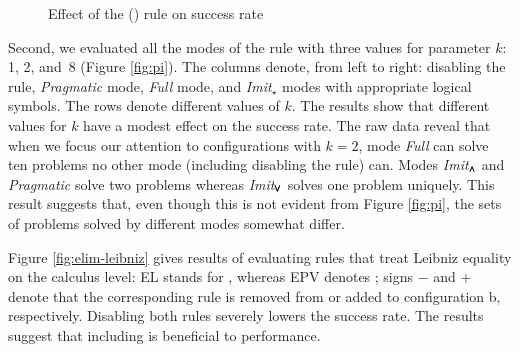 
\begin{figure}[t]
  \begin{center}
    \def\arraystretch{1.1}%
    \caption{Effect of the () rule on success rate }
    \label{fig:cases}
  \end{center}
\end{figure}

Second, we evaluated all the modes of the  rule with three values for
parameter $k$: 1, 2, and~8 (Figure \ref{fig:pi}). The columns denote, from left to
right: disabling the  rule, \emph{Pragmatic} mode, \emph{Full} mode,
and \emph{Imit}$_\star$ modes with appropriate logical symbols. The rows denote
different values of $k$. The results show that different values for $k$ have a
modest effect on the success rate. The raw data reveal that when we focus our
attention to configurations with $k=2$, mode \emph{Full} can solve ten problems
no other mode (including disabling the  rule) can. Modes
\emph{Imit}$_{\pmb{\land}}$ and \emph{Pragmatic} solve two  problems whereas
\emph{Imit}$_{\pmb{\lor}}$ solves one problem uniquely. This result suggests that, even
though this is not evident from Figure \ref{fig:pi}, the sets of problems solved 
by different modes somewhat differ.

Figure \ref{fig:elim-leibniz} gives results of evaluating rules that treat
Leibniz equality on the calculus level: EL stands for ,
whereas EPV denotes ; signs $-$ and $+$ denote that the corresponding rule is
removed from or added to configuration b, respectively. Disabling both rules
severely lowers the success rate. The results suggest that including
 is beneficial to performance.

